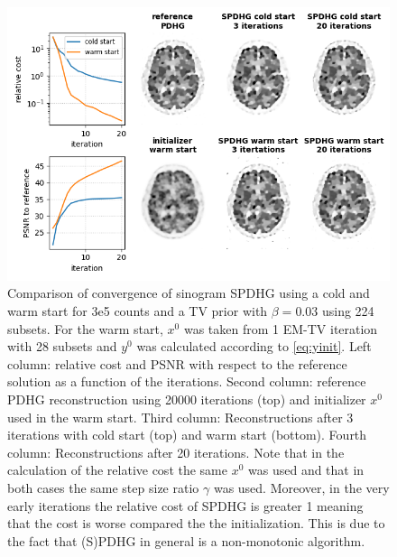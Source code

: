 \begin{figure}
  \centering
    \includegraphics[width=1.0\columnwidth]{figs/SPDHG_init_3.0E+05_224_3.0E-02_3.0E+00.png}
  \caption{Comparison of convergence of sinogram SPDHG using a cold and warm start
           for 3e5 counts and a TV prior with $\beta = 0.03$ using 224 subsets.
           For the warm start, $x^0$ was taken from 1 EM-TV iteration with 28 subsets
           and $y^0$ was calculated according to \eqref{eq:yinit}.
           Left column: relative cost and PSNR with respect to the reference solution as
           a function of the iterations.
           Second column: reference PDHG reconstruction using 20000 iterations (top) and
           initializer $x^0$ used in the warm start.
           Third column: Reconstructions after 3 iterations with cold start (top) and warm
           start (bottom).
           Fourth column: Reconstructions after 20 iterations.
           Note that in the calculation of the relative cost the same $x^0$ was used
           and that in both cases the same step size ratio $\gamma$ was used.
           Moreover, in the very early iterations the relative cost of SPDHG is greater 1
           meaning that the cost is worse compared the the initialization.
           This is due to the fact that (S)PDHG in general is a non-monotonic algorithm.
          }
  \label{fig:warm_start}
\end{figure}

